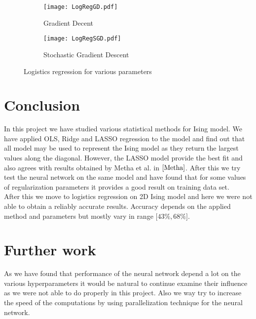 \documentclass[10pt]{article}
\begin{document}
	\begin{figure}
	\centering
	\begin{subfigure}[b]{1.0\textwidth}  
		\centering 
		\texttt{[image: LogRegGD.pdf]}
		\caption[]%
		{{\small Gradient Decent}}    
		\label{fig:LogRegGD}
	\end{subfigure}
	\hfill
	\begin{subfigure}[b]{1.0\textwidth}   
		\centering 
		\texttt{[image: LogRegSGD.pdf]}
		\caption[]%
		{{\small Stochastic Gradient Descent}}    
		\label{fig:LogRegS}
	\end{subfigure}
	\quad
	\caption[ The average and standard deviation of critical parameters ]
	{\small Logistics regression for various parameters} 
	\label{fig:LogReg}
\end{figure}




\section{Conclusion}
In this project we have studied various statistical methods for Ising model. We have applied OLS, Ridge and LASSO regression to the model and find out that all model may be used to represent the Ising model as they return the largest values along the diagonal. However, the LASSO model provide the best fit and also agrees with results obtained by Metha et al. in $\cite{Metha}$. 
After this we try test the neural network on the same model and have found that for some values of regularization parameters it provides a good result on training data set. \\
After this we move to logistics regression on 2D Ising model and here we were not able to obtain a reliably accurate results. Accuracy depends on the applied method and parameters but mostly vary in range $\lbrack 43\% , 68\% \rbrack$.\\

\section{Further work}
As we have found that performance of the neural network depend a lot on the various hyperparameters it would be natural to continue examine their influence as we were not able to do properly in this project. Also we way try to increase the speed of the computations by using parallelization technique for the neural network.
\end{document}
